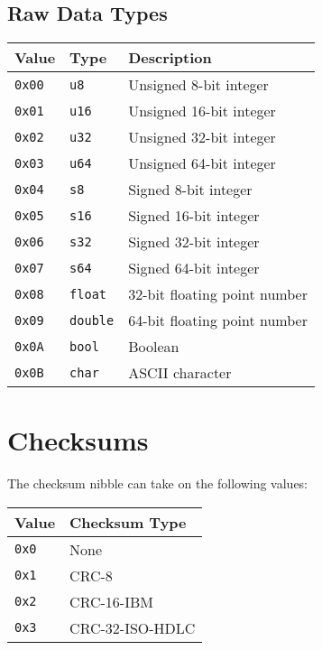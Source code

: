 \documentclass[a4paper]{article}
\begin{document}
\subsection{Raw Data Types}
\begin{longtable}{@{}lll@{}}
\toprule
Value    & Type             & Description                  \\
\midrule
\texttt{0x00} & \texttt{u8}       & Unsigned 8-bit integer       \\
\texttt{0x01} & \texttt{u16}      & Unsigned 16-bit integer      \\
\texttt{0x02} & \texttt{u32}      & Unsigned 32-bit integer      \\
\texttt{0x03} & \texttt{u64}      & Unsigned 64-bit integer      \\
\texttt{0x04} & \texttt{s8}       & Signed 8-bit integer         \\
\texttt{0x05} & \texttt{s16}      & Signed 16-bit integer        \\
\texttt{0x06} & \texttt{s32}      & Signed 32-bit integer        \\
\texttt{0x07} & \texttt{s64}      & Signed 64-bit integer        \\
\texttt{0x08} & \texttt{float}    & 32-bit floating point number \\
\texttt{0x09} & \texttt{double}   & 64-bit floating point number \\
\texttt{0x0A} & \texttt{bool}     & Boolean                      \\
\texttt{0x0B} & \texttt{char}     & ASCII character              \\
\bottomrule
\end{longtable}

\section{Checksums}\label{checksums}
The checksum nibble can take on the following values:
\begin{longtable}{@{}ll@{}}
\toprule
Value    & Checksum Type     \\
\midrule
\texttt{0x0} & None              \\
\texttt{0x1} & CRC-8             \\
\texttt{0x2} & CRC-16-IBM        \\
\texttt{0x3} & CRC-32-ISO-HDLC   \\
\bottomrule
\end{longtable}
\end{document}
